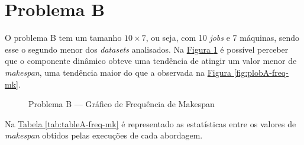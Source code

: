 \section{Problema B}
O problema B tem um tamanho $10 \times 7$, ou seja, com 10 \textit{jobs} e 7 máquinas, 
sendo esse o segundo menor dos \textit{datasets} analisados.
Na \hyperref[fig:plobB-freq-mk]{Figura \ref{fig:plobB-freq-mk}} 
é possível perceber que o componente dinâmico obteve uma 
tendência de atingir um valor menor de \textit{makespan}, 
uma tendência maior do que a observada 
na \hyperref[fig:plobA-freq-mk]{Figura \ref{fig:plobA-freq-mk}}.
\begin{figure}[!htb]
    \caption{Problema B — Gráfico de Frequência de Makespan}
    \label{fig:plobB-freq-mk}
    \begin{minipage}{.5\linewidth}
        \centering
        \subfloat[]{
            \label{plobB-freq-mk:a}
            \resizebox{\linewidth}{!}{}
        }
    \end{minipage}%
    \begin{minipage}{.5\linewidth}
        \centering
        \subfloat[]{
            \label{plobB-freq-mk:b}
            \resizebox{\linewidth}{!}{}
        }
    \end{minipage}\par\medskip
      \centering
      \subfloat[]{
        \label{plobB-freq-mk:c}
        \resizebox{.5\linewidth}{!}{}
      }
\end{figure}
Na
\hyperref[tab:tableA-freq-mk]{Tabela \ref{tab:tableA-freq-mk}}
é representado as estatísticas entre os valores de \textit{makespan} obtidos pelas execuções de cada abordagem.
